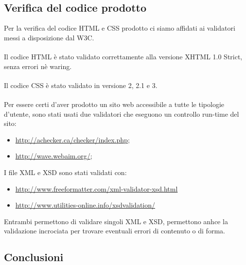 {	\subsection{Verifica del codice prodotto}{
		Per la verifica del codice HTML e CSS prodotto ci siamo affidati ai validatori messi a disposizione dal W3C.\\
		\\
		Il codice HTML è stato validato correttamente alla versione XHTML 1.0 Strict, senza errori nè waring.\\
		\\
		Il codice CSS è stato validato in versione 2, 2.1 e 3.\\
		\\
		Per essere certi d'aver prodotto un sito web accessibile a tutte le tipologie d'utente, sono stati usati due validatori che eseguono un controllo run-time del sito:
		\begin{itemize}\itemsep1pt
			\item \url{http://achecker.ca/checker/index.php};
			\item \url{http://wave.webaim.org/};
		\end{itemize}
		I file XML e XSD sono stati validati con:
		\begin{itemize}\itemsep1pt
		\item \url{http://www.freeformatter.com/xml-validator-xsd.html}
		\item \url{http://www.utilities-online.info/xsdvalidation/}
		\end{itemize}
		Entrambi permettono di validare singoli XML e XSD, permettono anhce la validazione incrociata per trovare eventuali errori di contenuto o di forma.
	}
	\subsection{Conclusioni}
}